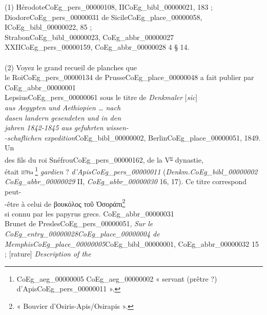 \documentclass{book}
\begin{document}
{\begin{paracol}{2}
\noindent \\
\\
\\
\\
\\
(1) Hérodote\gls{CoEg_pers_00000108}, II\gls{CoEg_bibl_00000021}, 183 ; Diodore\gls{CoEg_pers_00000031} de Sicile\gls{CoEg_place_00000058}, I\gls{CoEg_bibl_00000022}, 85 ;\\
Strabon\gls{CoEg_bibl_00000023}, \gls{CoEg_abbr_00000027} XXII\gls{CoEg_pers_00000159}, \gls{CoEg_abbr_00000028} 4 § 14.\\
\\
(2) Voyez le grand recueil de planches que\\
le Roi\gls{CoEg_pers_00000134} de Prusse\gls{CoEg_place_00000048} a fait publier par \gls{CoEg_abbr_00000001}\\
Lepsius\gls{CoEg_pers_00000061} sous le titre de \textit{Denkmaler} [\textit{sic}]\\
\textit{aus Aegypten und Aethiopien … nach\\
dasen landern gesendeten und in den\\
jahren 1842-1845 aus gefuhrten wissen-\\
-schaflichen expedition}\gls{CoEg_bibl_00000002}, Berlin\gls{CoEg_place_00000051}, 1849. Un\\
des fils du roi Snéfrou\gls{CoEg_pers_00000162}, de la V\textsuperscript{\underline{e}} dynastie,\\
était \includegraphics[height=6pt]{CoEg_Mariette_hiero_1857-04-01_4_1.png} \footnote{\foreignlanguage{translit}{\Gls{CoEg_aeg_00000005} \gls{CoEg_aeg_00000002}} « servant (prêtre ?) d’Apis\gls{CoEg_pers_00000011} ».} \textit{gardien} ? \textit{d’Apis\gls{CoEg_pers_00000011}} (\textit{Denkm.\gls{CoEg_bibl_00000002}\\
\gls{CoEg_abbr_00000029}} II, \textit{\gls{CoEg_abbr_00000030}} 16, 17). Ce titre correspond peut-\\
-être à celui de βουκόλος τοῦ Ὀσοράπι\footnote{« Bouvier d’Osiris-Apis/Osirapis ».}\\
si connu par les papyrus grecs. \Gls{CoEg_abbr_00000031}\\
Brunet de Presles\gls{CoEg_pers_00000051}, \textit{Sur le \Gls{CoEg_entry_00000028}\gls{CoEg_place_00000004} de\\
Memphis\gls{CoEg_place_00000005}}\gls{CoEg_bibl_00000001}, \gls{CoEg_abbr_00000032} 15 ; [rature] \textit{Description of the\\
}
\end{paracol}}
\end{document}
